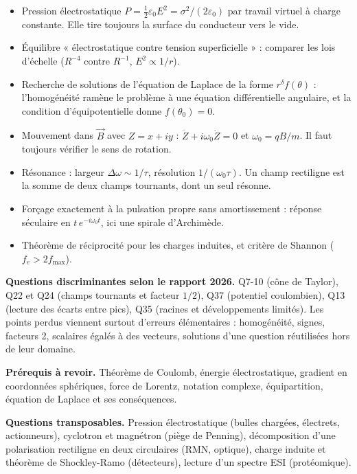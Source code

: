 \documentclass[11pt,a4paper]{article}
\providecommand{\tightlist}{\setlength{\itemsep}{0pt}\setlength{\parskip}{0pt}}
\begin{document}
\begin{itemize}
\tightlist
\item
  Pression électrostatique \(P=\frac12\varepsilon_0E^2=\sigma^2/(2\varepsilon_0)\) par travail virtuel à charge constante. Elle tire toujours la surface du conducteur vers le vide.
\item
  Équilibre « électrostatique contre tension superficielle » : comparer les lois d'échelle (\(R^{-4}\) contre \(R^{-1}\), \(E^2\propto1/r\)).
\item
  Recherche de solutions de l'équation de Laplace de la forme \(r^\delta f(\theta)\) : l'homogénéité ramène le problème à une équation différentielle angulaire, et la condition d'équipotentielle donne \(f(\theta_0)=0\).
\item
  Mouvement dans \(\vec B\) avec \(Z=x+iy\) : \(\ddot Z+i\omega_0\dot Z=0\) et \(\omega_0=qB/m\). Il faut toujours vérifier le sens de rotation.
\item
  Résonance : largeur \(\Delta\omega\sim1/\tau\), résolution \(1/(\omega_0\tau)\). Un champ rectiligne est la somme de deux champs tournants, dont un seul résonne.
\item
  Forçage exactement à la pulsation propre sans amortissement : réponse séculaire en \(t\,e^{-i\omega_0t}\), ici une spirale d'Archimède.
\item
  Théorème de réciprocité pour les charges induites, et critère de Shannon (\(f_e>2f_{\max}\)).
\end{itemize}

\textbf{Questions discriminantes selon le rapport 2026.} Q7-10 (cône de Taylor), Q22 et Q24 (champs tournants et facteur \(1/2\)), Q37 (potentiel coulombien), Q13 (lecture des écarts entre pics), Q35 (racines et développements limités). Les points perdus viennent surtout d'erreurs élémentaires : homogénéité, signes, facteurs 2, scalaires égalés à des vecteurs, solutions d'une question réutilisées hors de leur domaine.

\textbf{Prérequis à revoir.} Théorème de Coulomb, énergie électrostatique, gradient en coordonnées sphériques, force de Lorentz, notation complexe, équipartition, équation de Laplace et ses conséquences.

\textbf{Questions transposables.} Pression électrostatique (bulles chargées, électrets, actionneurs), cyclotron et magnétron (piège de Penning), décomposition d'une polarisation rectiligne en deux circulaires (RMN, optique), charge induite et théorème de Shockley-Ramo (détecteurs), lecture d'un spectre ESI (protéomique).
\end{document}
